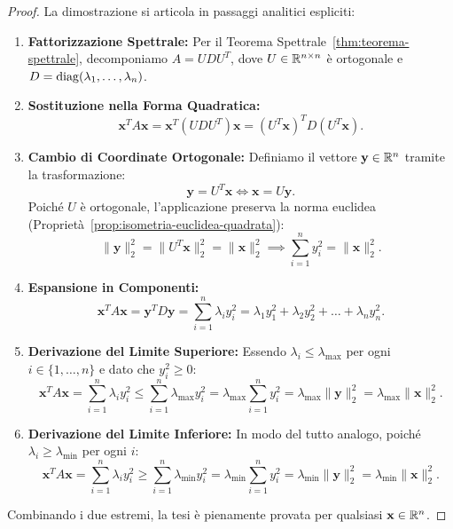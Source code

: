 \begin{proof}
La dimostrazione si articola in passaggi analitici espliciti:
\begin{enumerate}
    \item \textbf{Fattorizzazione Spettrale:} Per il Teorema Spettrale~\ref{thm:teorema-spettrale}, decomponiamo $A = U D U^T$, dove $U \in \mathbb{R}^{n \times n}$ \`e ortogonale e $D = \operatorname{diag}(\lambda_1, \dots, \lambda_n)$.
    \item \textbf{Sostituzione nella Forma Quadratica:}
    \begin{equation}
        \mathbf{x}^T A \mathbf{x} = \mathbf{x}^T (U D U^T) \mathbf{x} = (U^T \mathbf{x})^T D (U^T \mathbf{x}).
    \end{equation}
    \item \textbf{Cambio di Coordinate Ortogonale:} Definiamo il vettore $\mathbf{y} \in \mathbb{R}^n$ tramite la trasformazione:
    \begin{equation}
        \mathbf{y} = U^T \mathbf{x} \iff \mathbf{x} = U \mathbf{y}.
    \end{equation}
    Poich\'e $U$ \`e ortogonale, l'applicazione preserva la norma euclidea (Propriet\`a~\ref{prop:isometria-euclidea-quadrata}):
    \begin{equation}
        \|\mathbf{y}\|_2^2 = \|U^T \mathbf{x}\|_2^2 = \|\mathbf{x}\|_2^2 \implies \sum_{i=1}^n y_i^2 = \|\mathbf{x}\|_2^2.
    \end{equation}
    \item \textbf{Espansione in Componenti:}
    \begin{equation}
        \mathbf{x}^T A \mathbf{x} = \mathbf{y}^T D \mathbf{y} = \sum_{i=1}^n \lambda_i y_i^2 = \lambda_1 y_1^2 + \lambda_2 y_2^2 + \dots + \lambda_n y_n^2.
    \end{equation}
    \item \textbf{Derivazione del Limite Superiore:}
    Essendo $\lambda_i \le \lambda_{\max}$ per ogni $i \in \{1, \dots, n\}$ e dato che $y_i^2 \ge 0$:
    \begin{equation}
        \mathbf{x}^T A \mathbf{x} = \sum_{i=1}^n \lambda_i y_i^2 \le \sum_{i=1}^n \lambda_{\max} y_i^2 = \lambda_{\max} \sum_{i=1}^n y_i^2 = \lambda_{\max} \|\mathbf{y}\|_2^2 = \lambda_{\max} \|\mathbf{x}\|_2^2.
    \end{equation}
    \item \textbf{Derivazione del Limite Inferiore:}
    In modo del tutto analogo, poich\'e $\lambda_i \ge \lambda_{\min}$ per ogni $i$:
    \begin{equation}
        \mathbf{x}^T A \mathbf{x} = \sum_{i=1}^n \lambda_i y_i^2 \ge \sum_{i=1}^n \lambda_{\min} y_i^2 = \lambda_{\min} \sum_{i=1}^n y_i^2 = \lambda_{\min} \|\mathbf{y}\|_2^2 = \lambda_{\min} \|\mathbf{x}\|_2^2.
    \end{equation}
\end{enumerate}
Combinando i due estremi, la tesi \`e pienamente provata per qualsiasi $\mathbf{x} \in \mathbb{R}^n$.
\end{proof}

